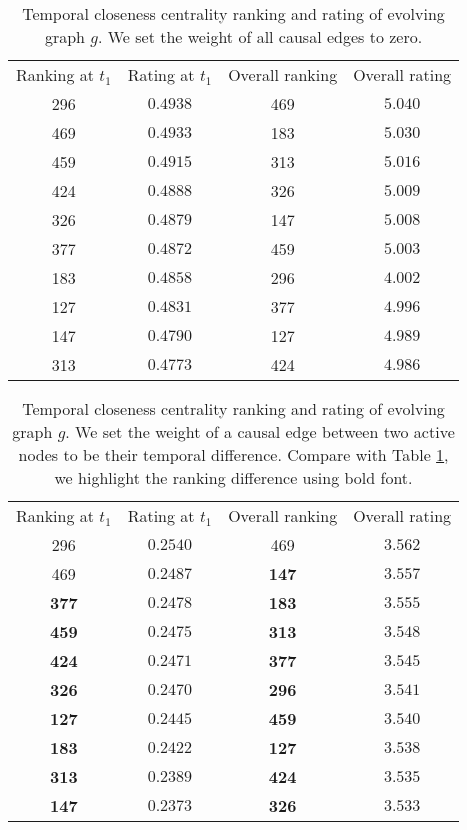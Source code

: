\documentclass[12pt]{article}
\theoremstyle{definition}
\begin{document}
\begin{table}[h]
  \begin{center}
\begin{tabular}{ c | c | c | c }
  Ranking at $t_1$ & Rating at $t_1$ & Overall ranking & Overall rating \\
   296 & $0.4938$ & 469 & $5.040$ \\
   469 & $0.4933$ & 183 & $5.030$ \\
   459 & $0.4915$ & 313 & $5.016$ \\
   424 & $0.4888$ & 326 & $5.009$ \\
   326 & $0.4879$ & 147 & $5.008$ \\
   377 & $0.4872$ & 459 & $5.003$ \\
   183 & $0.4858$ & 296 & $4.002$ \\
   127 & $0.4831$ & 377 & $4.996$ \\
   147 & $0.4790$ & 127 & $4.989$ \\
   313 & $0.4773$ & 424 & $4.986$ \\
\end{tabular}
\end{center}
\caption{Temporal closeness centrality ranking and rating of evolving graph $g$.
We set the weight of all causal edges to zero.}
\label{table:ranking3}
\end{table}

\begin{table}[h]
  \begin{center}
\begin{tabular}{ c | c | c | c }
  Ranking at $t_1$ & Rating at $t_1$ & Overall ranking & Overall rating \\
   296 & $0.2540$ & 469 & $3.562$ \\
   469 & $0.2487$ & \textbf{147} & $3.557$ \\
   \textbf{377} & $0.2478$ & \textbf{183} & $3.555$ \\
   \textbf{459} & $0.2475$ & \textbf{313} & $3.548$ \\
   \textbf{424} & $0.2471$ & \textbf{377} & $3.545$ \\
   \textbf{326} & $0.2470$ & \textbf{296} & $3.541$ \\
   \textbf{127} & $0.2445$ & \textbf{459} & $3.540$ \\
   \textbf{183} & $0.2422$ & \textbf{127} & $3.538$ \\
   \textbf{313} & $0.2389$ & \textbf{424} & $3.535$ \\
   \textbf{147} & $0.2373$ & \textbf{326} & $3.533$ \\
\end{tabular}
\end{center}
\caption{Temporal closeness centrality ranking and rating of evolving graph $g$.
We set the weight of a causal edge between two active nodes to be their temporal difference. Compare with Table \ref{table:ranking3}, we highlight the ranking difference using bold font.}
\label{table:ranking4}
\end{table}
\end{document}
